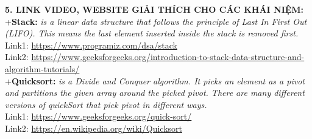 \documentclass[12pt,a4paper]{article}
\begin{document}
 \noindent\textbf{5. LINK VIDEO, WEBSITE GIẢI THÍCH CHO CÁC KHÁI NIỆM: }
\noindent+\textbf{Stack:} \textit{is a linear data structure that follows the principle of Last In First Out (LIFO). This means the last element inserted inside the stack is removed first.}\\
 \indent \textbullet\hspace{0.3cm} Link1: \url{https://www.programiz.com/dsa/stack}\\
\indent \textbullet\hspace{0.3cm} Link2: \url{https://www.geeksforgeeks.org/introduction-to-stack-data-structure-and-algorithm-tutorials/}\\
 \noindent+\textbf{Quicksort:}\textit{ is a Divide and Conquer algorithm. It picks an element as a pivot and partitions the given array around the picked pivot. There are many different versions of quickSort that pick pivot in different ways. }\\
 \indent \textbullet\hspace{0.3cm} Link1: \url{https://www.geeksforgeeks.org/quick-sort/}\\
  \indent \textbullet\hspace{0.3cm} Link2: \url{https://en.wikipedia.org/wiki/Quicksort}
  
\end{document}
